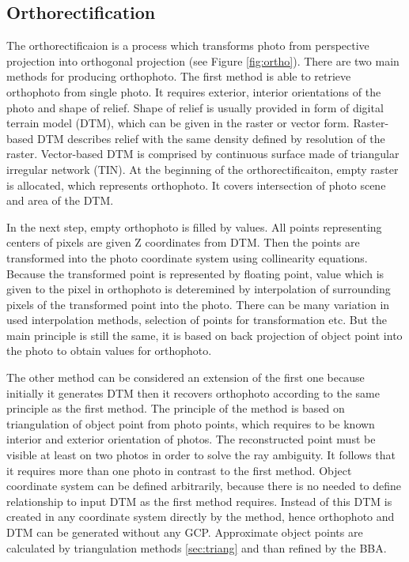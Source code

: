 \documentclass[a4paper,12pt]{article}
\begin{document}
\subsection{Orthorectification}


The orthorectificaion is a process which transforms photo from perspective projection into orthogonal projection (see Figure \ref{fig:ortho}). 
\label{sec:single_ortho}
There are two main methods for producing orthophoto. The first method is able to retrieve orthophoto 
from single photo. It requires exterior, interior orientations of the photo and shape of relief. 
Shape of relief is usually provided in form of digital terrain model (DTM), which 
can be given in the raster or vector form. Raster-based DTM describes relief with the same density defined by resolution of the raster.
Vector-based DTM is comprised by continuous surface made of triangular irregular network (TIN). 
At the beginning of the orthorectificaiton, empty raster is allocated, which represents orthophoto.
It covers intersection of photo scene and area of the DTM.

In the next step, empty orthophoto is filled by values. 
All points representing centers of pixels are given Z coordinates from DTM. 
Then the points are transformed into the photo coordinate system using collinearity equations.
Because the transformed point is represented by floating point, value which is given 
to the pixel in orthophoto is deteremined by interpolation of surrounding pixels of the transformed 
point into the photo. There can be many variation in used interpolation methods, selection of points 
for transformation etc. 
But the main principle is still the same, it is based on back projection of object point into 
the photo to obtain values for orthophoto.


The other method can be considered an extension of the first one because initially it generates DTM then it recovers orthophoto 
according to the same principle as the first method. The principle of the method is based on triangulation of object point
from photo points, which requires to be known interior and exterior orientation of photos. The reconstructed point 
must be visible at least on two photos in order to solve the ray ambiguity. It follows that it requires more than 
one photo in contrast to the first method.
Object coordinate system 
can be defined arbitrarily, because there is no needed to define relationship to input DTM as the first method requires.
Instead of this DTM is created in any coordinate system directly by the method,
hence orthophoto and DTM can be generated without any GCP. 
Approximate object points  are calculated by triangulation 
methods \ref{sec:triang} and than refined by the BBA. 
\end{document}
